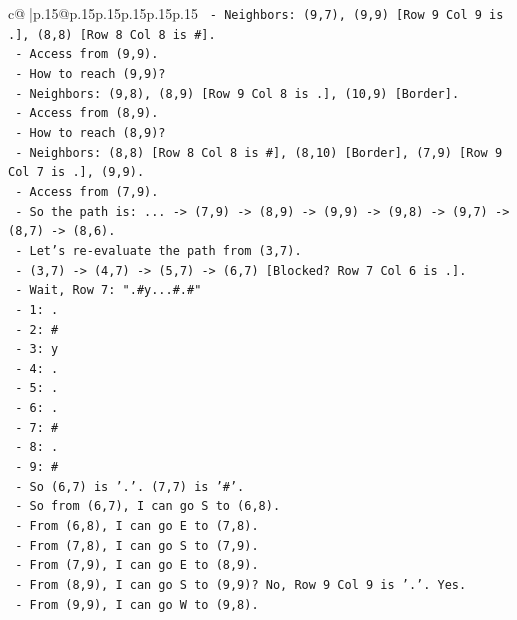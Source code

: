 \documentclass{article}
\begin{document}
{\begin{supertabular}{c@{$\;$}|p{.15\linewidth}@{}p{.15\linewidth}p{.15\linewidth}p{.15\linewidth}p{.15\linewidth}p{.15\linewidth}}
{{{\texttt{         {-} Neighbors: (9,7), (9,9) {[}Row 9 Col 9 is .{]}, (8,8) {[}Row 8 Col 8 is \#{]}.} \\
\texttt{         {-} Access from (9,9).} \\
\texttt{       {-} How to reach (9,9)?} \\
\texttt{         {-} Neighbors: (9,8), (8,9) {[}Row 9 Col 8 is .{]}, (10,9) {[}Border{]}.} \\
\texttt{         {-} Access from (8,9).} \\
\texttt{       {-} How to reach (8,9)?} \\
\texttt{         {-} Neighbors: (8,8) {[}Row 8 Col 8 is \#{]}, (8,10) {[}Border{]}, (7,9) {[}Row 9 Col 7 is .{]}, (9,9).} \\
\texttt{         {-} Access from (7,9).} \\
\texttt{       {-} So the path is: ... {-}> (7,9) {-}> (8,9) {-}> (9,9) {-}> (9,8) {-}> (9,7) {-}> (8,7) {-}> (8,6).} \\
\texttt{     {-} Let's re{-}evaluate the path from (3,7).} \\
\texttt{       {-} (3,7) {-}> (4,7) {-}> (5,7) {-}> (6,7) {[}Blocked? Row 7 Col 6 is .{]}.} \\
\texttt{       {-} Wait, Row 7: ".\#y...\#.\#"} \\
\texttt{         {-} 1: .} \\
\texttt{         {-} 2: \#} \\
\texttt{         {-} 3: y} \\
\texttt{         {-} 4: .} \\
\texttt{         {-} 5: .} \\
\texttt{         {-} 6: .} \\
\texttt{         {-} 7: \#} \\
\texttt{         {-} 8: .} \\
\texttt{         {-} 9: \#} \\
\texttt{       {-} So (6,7) is '.'. (7,7) is '\#'.} \\
\texttt{       {-} So from (6,7), I can go S to (6,8).} \\
\texttt{       {-} From (6,8), I can go E to (7,8).} \\
\texttt{       {-} From (7,8), I can go S to (7,9).} \\
\texttt{       {-} From (7,9), I can go E to (8,9).} \\
\texttt{       {-} From (8,9), I can go S to (9,9)? No, Row 9 Col 9 is '.'. Yes.} \\
\texttt{       {-} From (9,9), I can go W to (9,8).} \\
}}}
\end{supertabular}}
\end{document}
